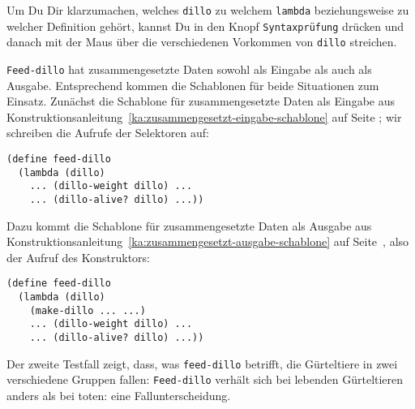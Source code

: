 \begin{aufgabeinline}
  Um Du Dir klarzumachen, welches \lstinline{dillo} zu welchem
  \lstinline{lambda} beziehungsweise zu welcher Definition gehört, kannst
  Du in \drscheme{} den Knopf \lstinline{Syntaxprüfung} drücken und
  danach mit der Maus über die verschiedenen Vorkommen von
  \lstinline{dillo} streichen.
\end{aufgabeinline}
%
\lstinline{Feed-dillo} hat zusammengesetzte Daten sowohl als Eingabe
als auch als Ausgabe.  Entsprechend kommen die Schablonen für beide
Situationen zum Einsatz.  Zunächst die Schablone für zusammengesetzte
Daten als Eingabe aus
Konstruktionsanleitung~\ref{ka:zusammengesetzt-eingabe-schablone} auf
Seite \pageref{ka:zusammengesetzt-eingabe-schablone}; wir schreiben die Aufrufe der Selektoren auf:
%
\begin{lstlisting}
(define feed-dillo
  (lambda (dillo)
    ... (dillo-weight dillo) ...
    ... (dillo-alive? dillo) ...))
\end{lstlisting}
%
Dazu kommt die Schablone für zusammengesetzte Daten als Ausgabe aus
Konstruktionsanleitung~\ref{ka:zusammengesetzt-ausgabe-schablone} auf
Seite~\pageref{ka:zusammengesetzt-ausgabe-schablone}, also
der Aufruf des Konstruktors:
%
\begin{lstlisting}
(define feed-dillo
  (lambda (dillo)
    (make-dillo ... ...)
    ... (dillo-weight dillo) ...
    ... (dillo-alive? dillo) ...))
\end{lstlisting}
%
Der zweite Testfall zeigt, dass, was \lstinline{feed-dillo}
betrifft, die Gürteltiere in zwei verschiedene Gruppen fallen:
\lstinline{Feed-dillo} verhält sich bei lebenden Gürteltieren anders als
bei toten: eine Fallunterscheidung.

